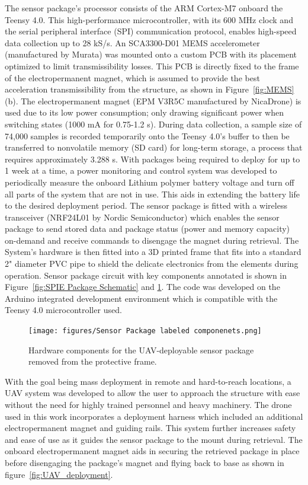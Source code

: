 \documentclass[]{spie}  %
\begin{document}
	The sensor package's processor consists of the ARM Cortex-M7 onboard the Teensy 4.0. This high-performance microcontroller, with its 600 MHz clock and the serial peripheral interface (SPI) communication protocol, enables high-speed data collection up to 28 kS/s. An SCA3300-D01 MEMS accelerometer (manufactured by Murata) was mounted onto a custom PCB with its placement optimized to limit transmissibility losses. This PCB is directly fixed to the frame of the electropermanent magnet, which is assumed to provide the best acceleration transmissibility from the structure, as shown in Figure~\ref{fig:MEMS}(b). The electropermanent magnet (EPM V3R5C manufactured by NicaDrone) is used due to its low power consumption; only drawing significant power when switching states (1000 mA for 0.75-1.2 s). During data collection, a sample size of 74,000 samples is recorded temporarily onto the Teensy 4.0's buffer to then be transferred to nonvolatile memory (SD card) for long-term storage, a process that requires approximately 3.288 s. With packages being required to deploy for up to 1 week at a time, a power monitoring and control system was developed to periodically measure the onboard Lithium polymer battery voltage and turn off all parts of the system that are not in use. This aids in extending the battery life to the desired deployment period. The sensor package is fitted with a wireless transceiver (NRF24L01 by Nordic Semiconductor) which enables the sensor package to send stored data and package status (power and memory capacity) on-demand and receive commands to disengage the magnet during retrieval. The System's hardware is then fitted into a 3D printed frame that fits into a standard 2" diameter PVC pipe to shield the delicate electronics from the elements during operation. Sensor package circuit with key components annotated is shown in Figure~\ref{fig:SPIE Package Schematic} and \ref{fig:Sensor_Package_labeled_componenets}. The code was developed on the Arduino integrated development environment which is compatible with the Teensy 4.0 microcontroller used.  

	\begin{figure} [H]
	\centering
	\texttt{[image: figures/Sensor Package labeled componenets.png]}
	\caption{Hardware components for the UAV-deployable sensor package removed from the protective frame.}
	\label{fig:Sensor_Package_labeled_componenets}
	\end{figure}

	
	With the goal being mass deployment in remote and hard-to-reach locations, a UAV system was developed to allow the user to approach the structure with ease without the need for highly trained personnel and heavy machinery. The drone used in this work incorporates a deployment harness which included an additional electropermanent magnet and guiding rails. This system further increases safety and ease of use as it guides the sensor package to the mount during retrieval. The onboard electropermanent magnet aids in securing the retrieved package in place before disengaging the package’s magnet and flying back to base as shown in figure~\ref{fig:UAV_deployment}\cite{Carroll2021}.
\end{document}
